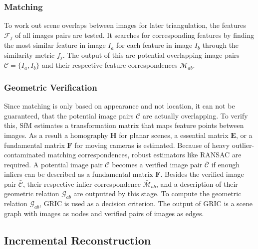 \documentclass[conference,]{IEEEtran}
\begin{document}
\hypertarget{matching}{%
\subsubsection{Matching}\label{matching}}

To work out scene overlaps between images for later triangulation, the
features \(\mathcal{F}_j\) of all images pairs are tested. It searches
for corresponding features by finding the most similar feature in image
\(I_a\) for each feature in image \(I_b\) through the similarity metric
\(f_j\). The output of this are potential overlapping image pairs
\(\mathcal{C}=\{I_a,I_b\}\) and their respective feature correspondences
\(\mathcal{M}_{ab}\).\autocite{schönberger2016}

\hypertarget{geometric-verification}{%
\subsubsection{Geometric Verification}\label{geometric-verification}}

Since matching is only based on appearance and not location, it can not
be guaranteed, that the potential image pairs \(\mathcal{C}\) are
actually overlapping. To verify this, SfM estimates a transformation
matrix that maps feature points between images. As a result a homography
\(\mathbf{H}\) for planar scenes, a essential matrix \(\mathbf{E}\), or
a fundamental matrix \(\mathbf{F}\) for moving cameras is estimated.
Because of heavy outlier-contaminated matching correspondences, robust
estimators like RANSAC \autocite{fischler1981} are required. A potential
image pair \(\mathcal{C}\) becomes a verified image pair
\(\bar{\mathcal{C}}\) if enough inliers can be described as a
fundamental matrix \(\mathbf{F}\). Besides the verified image pair
\(\bar{\mathcal{C}}\), their respective inlier correspondence
\(\bar{\mathcal{M}}_{ab}\), and a description of their geometric
relation \(\mathcal{G}_{ab}\) are outputted by this stage. To compute
the geometric relation \(\mathcal{G}_{ab}\), GRIC \autocite{torr1997} is
used as a decision criterion. The output of GRIC is a scene graph with
images as nodes and verified pairs of images as edges.
\autocite{schönberger2016}

\hypertarget{incremental-reconstruction}{%
\subsection{Incremental
Reconstruction}\label{incremental-reconstruction}}
\end{document}
